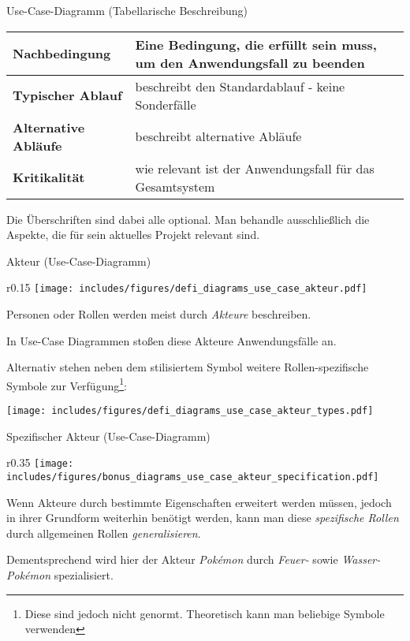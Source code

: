 \begin{diag}{Use-Case-Diagramm (Tabellarische Beschreibung)}
\begin{tabularx}{\textwidth}{|>{\bfseries}l|X|}
        Nachbedingung       & Eine Bedingung, die erfüllt sein muss, um den Anwendungsfall zu beenden                                                          \\\hline
        Typischer Ablauf    & beschreibt den Standardablauf - keine Sonderfälle                                                                                \\\hline
        Alternative Abläufe & beschreibt alternative Abläufe                                                                                                   \\\hline
        Kritikalität        & wie relevant ist der Anwendungsfall für das Gesamtsystem                                                                         \\\hline
    \end{tabularx}

    Die Überschriften sind dabei alle optional.
    Man behandle ausschließlich die Aspekte, die für sein aktuelles Projekt relevant sind.
\end{diag}

\begin{diag}{Akteur (Use-Case-Diagramm)}
    \begin{wrapfigure}{r}{0.15\textwidth}
        \centering
        \texttt{[image: includes/figures/defi\_diagrams\_use\_case\_akteur.pdf]}
    \end{wrapfigure}
    Personen oder Rollen werden meist durch \emph{Akteure} beschreiben.

    In Use-Case Diagrammen stoßen diese Akteure Anwendungsfälle an.

    Alternativ stehen neben dem stilisiertem Symbol weitere Rollen-spezifische Symbole zur Verfügung\footnote{Diese sind jedoch nicht genormt. Theoretisch kann man beliebige Symbole verwenden}:

    \begin{center}
        \texttt{[image: includes/figures/defi\_diagrams\_use\_case\_akteur\_types.pdf]}
    \end{center}
\end{diag}

\begin{bonus}{Spezifischer Akteur (Use-Case-Diagramm)}
    \begin{wrapfigure}{r}{0.35\textwidth}
        \centering
        \texttt{[image: includes/figures/bonus\_diagrams\_use\_case\_akteur\_specification.pdf]}
    \end{wrapfigure}
    Wenn Akteure durch bestimmte Eigenschaften erweitert werden müssen, jedoch in ihrer Grundform weiterhin benötigt werden, kann man diese \emph{spezifische Rollen} durch allgemeinen Rollen \emph{generalisieren}.

    Dementsprechend wird hier der Akteur \emph{Pokémon} durch \emph{Feuer-} sowie \emph{Wasser-Pokémon} spezialisiert.

    \vspace{7em}
\end{bonus}

